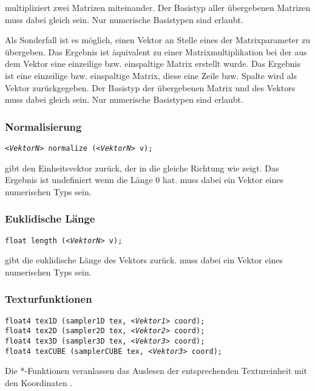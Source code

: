 \documentclass[twoside,a4paper,fleqn,12pt]{article}
\begin{document}
 multipliziert zwei Matrizen miteinander. Der Basistyp aller
übergebenen Matrizen muss dabei gleich sein. Nur numerische Basistypen
sind erlaubt.

Als Sonderfall ist es möglich, einen Vektor an Stelle eines der Matrixparameter zu
übergeben. Das Ergebnis ist äquivalent zu einer Matrixmultiplikation bei der
aus dem Vektor eine einzeilige bzw. einspaltige Matrix erstellt wurde. Das
Ergebnis ist eine einzeilige bzw. einspaltige Matrix, diese eine Zeile bzw.
Spalte wird als Vektor zurückgegeben. Der Basistyp der übergebenen Matrix
und des Vektors muss dabei gleich sein. Nur numerische Basistypen sind erlaubt.

\subsubsection{Normalisierung}

\texttt{\emph{<VektorN>} normalize (\emph{<VektorN>} v);}

 gibt den Einheitsvektor zurück, der in die gleiche Richtung wie
 zeigt. Das Ergebnis ist undefiniert wenn  die Länge $0$ hat.
 muss dabei ein Vektor eines numerischen Typs sein.

\subsubsection{Euklidische Länge}

\texttt{float length (\emph{<VektorN>} v);}

 gibt die euklidische Länge des Vektors  zurück.
 muss dabei ein Vektor eines numerischen Typs sein.

\subsubsection{Texturfunktionen}
\label{Texturfunktionen}

\texttt{float4 tex1D (sampler1D tex, \emph{<Vektor1>} coord);}\\
\texttt{float4 tex2D (sampler2D tex, \emph{<Vektor2>} coord);}\\
\texttt{float4 tex3D (sampler3D tex, \emph{<Vektor3>} coord);}\\
\texttt{float4 texCUBE (samplerCUBE tex, \emph{<Vektor3>} coord);}

Die *-Funktionen veranlassen das Auslesen der  entsprechenden
Textureinheit mit den Koordinaten .
\end{document}
